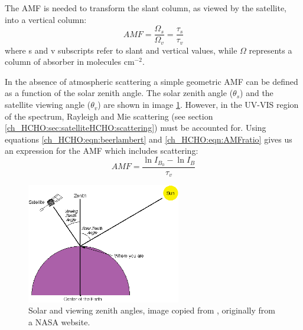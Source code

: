     The AMF is needed to transform the slant column, as viewed by the satellite, into a vertical column:
    \begin{equation} \label{ch_HCHO:eqn:AMFratio}
      AMF = \frac{\Omega_s}{\Omega_v} = \frac{\tau_s}{\tau_v}
    \end{equation}
    where s and v subscripts refer to slant and vertical values, while $\Omega$ represents a column of absorber in molecules cm$^{-2}$.

    In the absence of atmospheric scattering a simple geometric AMF can be defined as a function of the solar zenith angle. 
    The solar zenith angle ($\theta_s$) and the satellite viewing angle ($\theta_v$) are shown in image \ref{ch_HCHO:fig:zenithangle}.
    However, in the UV-VIS region of the spectrum, Rayleigh and Mie scattering (see section \ref{ch_HCHO:sec:satelliteHCHO:scattering}) must be accounted for.
    Using equations \ref{ch_HCHO:eqn:beerlambert} and \ref{ch_HCHO:eqn:AMFratio} gives us an expression for the AMF which includes scattering:
    \begin{equation} \label{ch_HCHO:eqn:AMFscattering}
      AMF = \frac{\ln{I_{B_0}}-\ln{I_B}}{\tau_v}
    \end{equation}

    \begin{figure}[!htbp]\begin{center}
      \includegraphics[width=0.6\textwidth]{Figures/ZenithAngles.png}
      \caption{Solar and viewing zenith angles, image copied from \citet{SZA_Image}, originally from a NASA website.}
      \label{ch_HCHO:fig:zenithangle}
    \end{center}\end{figure}

